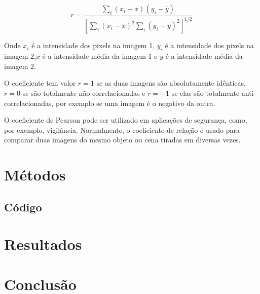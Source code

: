 \documentclass[10pt,a4paper]{article}
\begin{document}
\begin{equation*}r = \frac{  
\displaystyle{\sum_{i} (x_i-\bar{x})(y_i-  
\bar{y})}}{\displaystyle{\left[  
\sum_{i}(x_i-\bar{x})^2  
\sum_{i}(y_i-\bar{y})^2\right]^{1/2}}}  
\end{equation*}  

Onde $x_i$ é a intensidade dos pixels na imagem 1, $y_i$ é a
intensidade dos pixels na imagem 2,$\bar{x}$ é a intensidade média da
imagem 1 e $\bar{y}$ é a intensidade média da imagem 2.

O coeficiente tem valor $r=1$ se as duas imagens são absolutamente
idênticas, $r=0$ se são totalmente não correlacionadas e $r=-1$ se elas
são totalmente anti-correlacionadas, por exemplo se uma imagem é o
negativo da outra.

O coeficiente de Pearson pode ser utilizado em
aplicações de segurança, como, por exemplo, vigilância. Normalmente, 
o coeficiente de relação é usado para comparar duas imagens do mesmo
objeto ou cena tiradas em diversas vezes.

\section{Métodos}



\subsection{Código}

\section{Resultados}

\section{Conclusão}


\begin{small}
  
\end{small}
\end{document}
